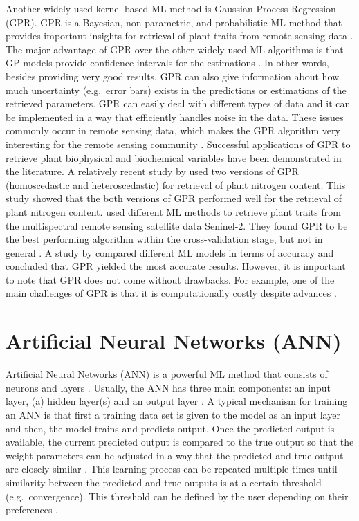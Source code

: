 \documentclass[a4paper, twoside]{templates/ociamthesis}
\begin{document}
Another widely used kernel-based ML method is Gaussian Process Regression (GPR). GPR is a Bayesian, non-parametric, and probabilistic ML method that provides important insights for retrieval of plant traits from remote sensing data \citep{camps2016survey, camps2019perspective}. The major advantage of GPR over the other widely used ML algorithms is that GP models provide confidence intervals for the estimations \citep{berger2020retrieval}. In other words, besides providing very good results, GPR can also give information about how much uncertainty (e.g.~error bars) exists in the predictions or estimations of the retrieved parameters. GPR can easily deal with different types of data and it can be implemented in a way that efficiently handles noise in the data. These issues commonly occur in remote sensing data, which makes the GPR algorithm very interesting for the remote sensing community \citep{camps2016survey, camps2019perspective}. Successful applications of GPR to retrieve plant biophysical and biochemical variables have been demonstrated in the literature. A relatively recent study by \citet{berger2020retrieval} used two versions of GPR (homoscedastic and heteroscedastic) for retrieval of plant nitrogen content. This study showed that the both versions of GPR performed well for the retrieval of plant nitrogen content. \citet{upreti2019comparison} used different ML methods to retrieve plant traits from the multispectral remote sensing satellite data Seninel-2. They found GPR to be the best performing algorithm within the cross-validation stage, but not in general \citep{upreti2019comparison}. A study by \citet{caicedo2014toward} compared different ML models in terms of accuracy and concluded that GPR yielded the most accurate results. However, it is important to note that GPR does not come without drawbacks. For example, one of the main challenges of GPR is that it is computationally costly despite advances \citep{camps2019perspective}.

\hypertarget{ann}{%
\section{Artificial Neural Networks (ANN)}\label{ann}}

Artificial Neural Networks (ANN) is a powerful ML method that consists of neurons and layers \citep{simon1999neural}. Usually, the ANN has three main components: an input layer, (a) hidden layer(s) and an output layer \citep{jensen1999predictive, quan2017radiative}. A typical mechanism for training an ANN is that first a training data set is given to the model as an input layer and then, the model trains and predicts output. Once the predicted output is available, the current predicted output is compared to the true output so that the weight parameters can be adjusted in a way that the predicted and true output are closely similar \citep{ingram2005mapping, quan2017radiative}. This learning process can be repeated multiple times until similarity between the predicted and true outputs is at a certain threshold (e.g.~convergence). This threshold can be defined by the user depending on their preferences \citep{jensen1999predictive, quan2017radiative}.
\end{document}
